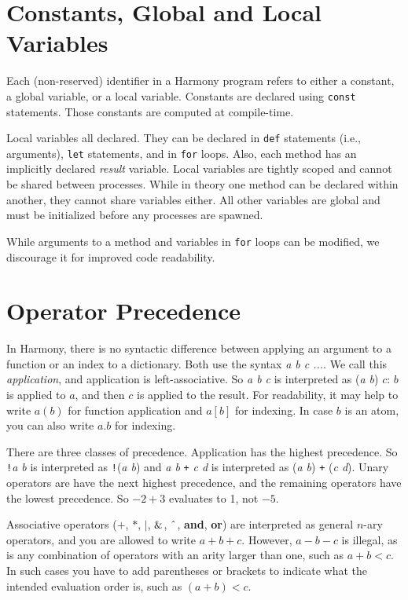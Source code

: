 \documentclass{report}
\begin{document}
\section{Constants, Global and Local Variables}

Each (non-reserved) identifier in a Harmony program refers to either
a constant, a global variable, or a local variable.
Constants are declared using \texttt{const} statements.
Those constants are computed at compile-time.

Local variables all declared.  They can be declared in
\texttt{def} statements (i.e., arguments),
\texttt{let} statements, and in \texttt{for} loops.
Also, each method has an implicitly declared
\textit{result} variable.
Local variables are tightly scoped and cannot be shared
between processes.
While in theory one method can be declared within another,
they cannot share variables either.
All other variables are global and must be initialized
before any processes are spawned.

While arguments to a method and variables in \texttt{for} loops
can be modified, we discourage it for improved code readability.

\section{Operator Precedence}

In Harmony, there is no syntactic difference between applying an argument to a function
or an index to a dictionary.  Both use the syntax \textit{a b c ...}.
We call this \emph{application}, and application is left-associative.
So \textit{a b c} is interpreted as (\textit{a b}) $c$: $b$ is applied to $a$,
and then $c$ is applied to the result.
For readability, it may help to write $a(b)$ for function application and
$a[b]$ for indexing.  In case $b$ is an atom, you can also write $a.b$ for indexing.

There are three classes of precedence.
Application has the highest precedence.  So \texttt{!}\textit{a b} is interpreted as
\texttt{!}(\textit{a b}) and \textit{a b} \texttt{+} \textit{c d} is interpreted as
(\textit{a b}) \texttt{+} (\textit{c d}).
Unary operators are have the next highest precedence,
and the remaining operators have the lowest precedence.
So $-2 + 3$ evaluates to 1, not $-5$.

Associative operators ($+$, $*$, $|$, $\string&$, $\string^$, \textbf{and}, \textbf{or})
are interpreted as general $n$-ary operators, and you are allowed to write
$a + b + c$.  However, $a - b - c$ is illegal, as is any combination of operators with an
arity larger than one, such as $a + b < c$.
In such cases you have to add parentheses or brackets to indicate what
the intended evaluation order is, such as $(a + b) < c$.
\end{document}
